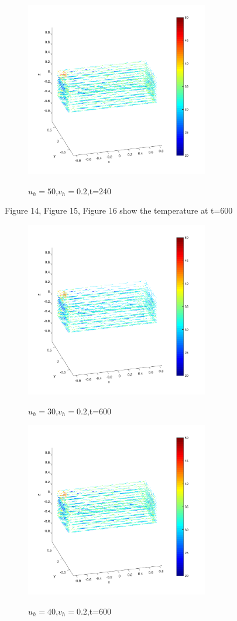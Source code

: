 \documentclass[12pt,a4paper,titlepage]{article}
\begin{document}
\begin{figure}[htb]
  \centering
  \includegraphics[width=8cm]{4-2.pdf}\\
  \caption{$u_h=50$,$v_h=0.2$,t=240}\label{4-2_p}
\end{figure}

Figure 14, Figure 15, Figure 16 show the temperature at t=600

\begin{figure}[htb]
  \centering
  \includegraphics[width=8cm]{8-5.pdf}\\
  \caption{$u_h=30$,$v_h=0.2$,t=600}\label{8-5_p}
\end{figure}

\begin{figure}[htb]
  \centering
  \includegraphics[width=8cm]{10-5.pdf}\\
  \caption{$u_h=40$,$v_h=0.2$,t=600}\label{10-5_p}
\end{figure}
\end{document}
